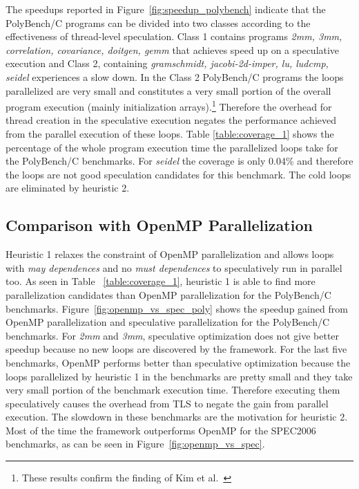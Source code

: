 \documentclass[10pt]{report}          %
\begin{document}
The speedups reported in Figure~\ref{fig:speedup_polybench} indicate that the  PolyBench/C programs can be divided into two classes according to the effectiveness of thread-level speculation. Class 1 contains programs\textit{ 2mm, 3mm, correlation, covariance, doitgen, gemm} that achieves speed up on a speculative execution and Class 2, containing \textit{gramschmidt, jacobi-2d-imper, lu, ludcmp, seidel} experiences a slow down.  In the Class 2 PolyBench/C programs the loops parallelized are very small and constitutes a very small portion of the overall program execution (mainly initialization arrays).\footnote{These results confirm the finding of Kim et al.~\cite{sd3}}  Therefore the overhead for thread creation in the speculative execution negates the performance achieved from the parallel execution of these loops. Table \ref{table:coverage_1} shows the percentage of the whole program execution time the parallelized loops take for the PolyBench/C benchmarks. For \textit{seidel} the coverage is only 0.04\% and therefore the loops are not good speculation candidates for this benchmark.  The cold loops are eliminated by heuristic 2.

\subsection{Comparison with OpenMP Parallelization}

Heuristic 1 relaxes the constraint of OpenMP parallelization and allows loops with \textit{may dependences} and no \textit{must dependences} to speculatively run in parallel too.  As seen in Table ~\ref{table:coverage_1}, heuristic 1 is able to find more parallelization candidates than OpenMP parallelization for the PolyBench/C benchmarks.  Figure~\ref{fig:openmp_vs_spec_poly} shows the speedup gained from OpenMP parallelization and speculative parallelization for the PolyBench/C benchmarks.  For \textit{2mm} and \textit{3mm}, speculative optimization does not give better speedup because no new loops are discovered by the framework.  For the last five benchmarks, OpenMP performs better than speculative optimization because the loops parallelized by heuristic 1 in the benchmarks are pretty small and they take very small portion of the benchmark execution time.  Therefore executing them speculatively causes the overhead from TLS to negate the gain from parallel execution.  The slowdown in these benchmarks are the motivation for heuristic 2.\\
Most of the time the framework outperforms OpenMP for the SPEC2006 benchmarks, as can be seen in Figure~\ref{fig:openmp_vs_spec}.
\end{document}
